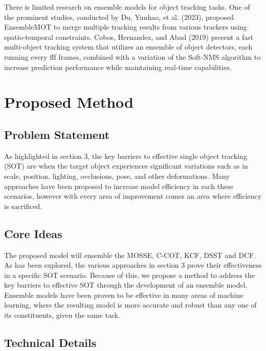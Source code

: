 \documentclass{article}
\begin{document}
There is limited research on ensemble models for object tracking tasks. One of the prominent studies, conducted by Du, Yunhao, et al. (2023), proposed EnsembleMOT to merge multiple tracking results from various trackers using spatio-temporal constraints. Cobos, Hernandez, and Abad (2019) present a fast multi-object tracking system that utilizes an ensemble of object detectors, each running every fff frames, combined with a variation of the Soft-NMS algorithm to increase prediction performance while maintaining real-time capabilities.


\section{Proposed Method}

\subsection{Problem Statement}

As highlighted in section 3, the key barriers to effective single object tracking (SOT) are when the target object experiences significant variations such as in scale, position, lighting, occlusions, pose, and other deformations. Many approaches have been proposed to increase model efficiency in each these scenarios, however with every area of improvement comes an area where efficiency is sacrificed.

\subsection{Core Ideas}

The proposed model will ensemble the MOSSE, C-COT, KCF, DSST and DCF. As has been explored, the various approaches in section 3 prove their effectiveness in a specific SOT scenario. Because of this, we propose a method to address the key barriers to effective SOT through the development of an ensemble model. Ensemble models have been proven to be effective in many areas of machine learning, where the resulting model is more accurate and robust than any one of its constituents, given the same task.

\subsection{Technical Details}
\end{document}
